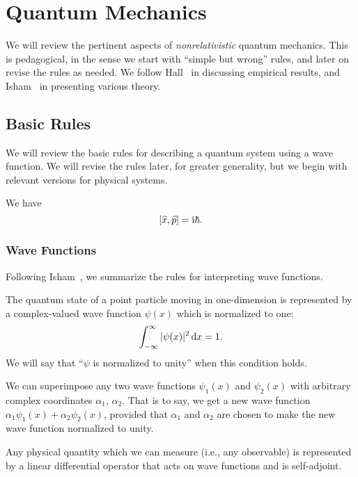 \chapter{Quantum Mechanics}

\M We will review the pertinent aspects of \emph{nonrelativistic} quantum
mechanics. This is pedagogical, in the sense we start with ``simple but wrong''
rules, and later on revise the rules as needed. We follow
Hall~\cite{Hall:2013jtz} in discussing empirical results, and
Isham~\cite{Isham:1995lq} in presenting various theory.

\section{Basic Rules}\label{sec:qm:basic-rules}

\M We will review the basic rules for describing a quantum system using
a wave function. We will revise the rules later, for greater generality,
but we begin with relevant versions for physical systems.

We have
\begin{equation}\label{eq:position-momentum-uncertainty-commutator}
[\widehat{x},\widehat{p}] = \mathrm{i}\hbar.
\end{equation}


\subsection{Wave Functions}

\M Following Isham~\cite{Isham:1995lq}, we summarize the rules for
interpreting wave functions.

The quantum state of a point particle moving in one-dimension is
represented by a complex-valued wave function $\psi(x)$ which is
normalized to one:
\begin{equation}
\int^{\infty}_{-\infty}|\psi(x)|^{2}\,\mathrm{d} x = 1.
\end{equation}
We will say that ``$\psi$ is normalized to unity'' when this condition holds.

We can superimpose any two wave functions $\psi_{1}(x)$ and
$\psi_{2}(x)$ with arbitrary complex coordinates $\alpha_{1}$, $\alpha_{2}$.
That is to say, we get a new wave function
$\alpha_{1}\psi_{1}(x) + \alpha_{2}\psi_{2}(x)$, provided that
$\alpha_{1}$ and $\alpha_{2}$ are chosen to make the new wave function
normalized to unity.

Any physical quantity which we can measure (i.e., any observable) is
represented by a linear differential operator that acts on wave functions
and is self-adjoint.

